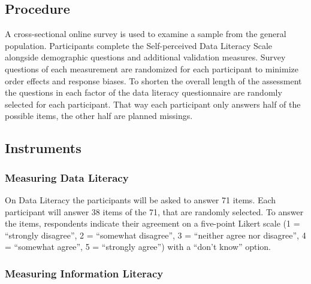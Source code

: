 \documentclass[
  12pt,
  a4paper,
  twoside]{article}
\begin{document}
\subsection{Procedure}\label{procedure}

A cross-sectional online survey is used to examine a sample from the general population. Participants complete the Self-perceived Data Literacy Scale alongside demographic questions and additional validation measures. Survey questions of each measurement are randomized for each participant to minimize order effects and response biases. To shorten the overall length of the assessment the questions in each factor of the data literacy questionnaire are randomly selected for each participant. That way each participant only answers half of the possible items, the other half are planned missings.

\subsection{Instruments}\label{instruments}

\subsubsection{Measuring Data Literacy}\label{measuring-data-literacy}

On Data Literacy the participants will be asked to answer 71
items. Each participant will answer 38 items of the 71, that are randomly selected.
To answer the items, respondents indicate their agreement on a five-point Likert
scale (1 = ``strongly disagree'', 2 = ``somewhat disagree'', 3 = ``neither agree nor
disagree'', 4 = ``somewhat agree'', 5 = ``strongly agree'') with a ``don't know''
option.

\subsubsection{Measuring Information Literacy}\label{measuring-information-literacy}
\end{document}
